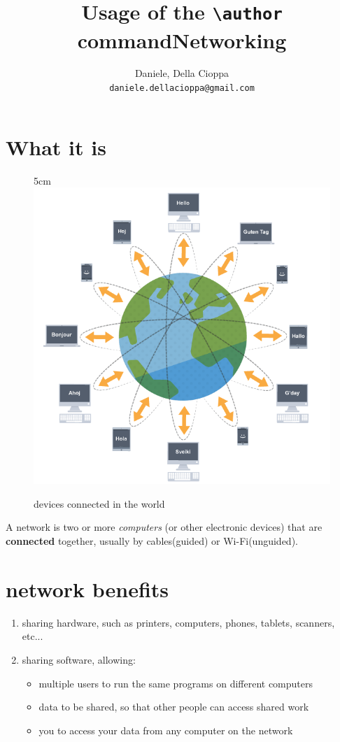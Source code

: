 \documentclass[a4paper,12pt]{article}
\author{
  Daniele, Della Cioppa\\
  \texttt{daniele.dellacioppa@gmail.com}
}
\title{Usage of the \texttt{\textbackslash author} command}
\begin{document}
\title{Networking}
\maketitle
\hypersetup{linkcolor=teal}
\tableofcontents
\hypersetup{linkcolor=blue}
\clearpage

\section{What it is}


\begin{figure}[21]{5cm}
\centering
\includegraphics[width=12cm]{./net.png}
\caption{devices connected in the world}\label{wrap-fig:1}
\end{figure}

A network is two or more \emph{computers} (or other electronic devices) that are \textbf{connected} together, usually by cables(guided) or Wi-Fi(unguided).



\section {network benefits}
\begin{enumerate}
\item {sharing hardware, such as printers, computers, phones, tablets, scanners, etc...}\footnotemark{}
\item {sharing software, allowing:}
    \begin{itemize}
    \item{multiple users to run the same programs on different computers}
    \item{data to be shared, so that other people can access shared work}
    \item{you to access your data from any computer on the network}
    \end{itemize}
\end{enumerate}
\end{document}
